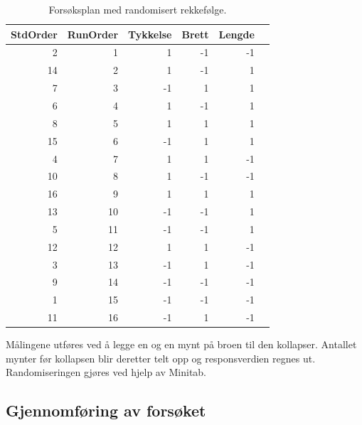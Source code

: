 \documentclass[12pt]{article}
\begin{document}
\begin{table}[H]
  \centering
  \caption{Forsøksplan med randomisert rekkefølge.}
    \begin{tabular}{rrrrrr}
    \toprule
    \multicolumn{1}{l}{\textbf{StdOrder}} & \multicolumn{1}{l}{\textbf{RunOrder}} & \multicolumn{1}{l}{\textbf{Tykkelse}} & \multicolumn{1}{l}{\textbf{Brett}} & \multicolumn{1}{l}{\textbf{Lengde}} & \\
    \midrule
    2     & 1     & 1     & -1    & -1  \\
    \midrule
    14    & 2     & 1     & -1    & 1   \\
    \midrule
    7     & 3     & -1    & 1     & 1   \\
    \midrule
    6     & 4     & 1     & -1    & 1   \\
    \midrule
    8     & 5     & 1     & 1     & 1   \\
    \midrule
    15    & 6     & -1    & 1     & 1   \\
    \midrule
    4     & 7     & 1     & 1     & -1   \\
    \midrule
    10    & 8     & 1     & -1    & -1  \\
    \midrule
    16    & 9     & 1     & 1     & 1   \\
    \midrule
    13    & 10    & -1    & -1    & 1    \\
    \midrule
    5     & 11    & -1    & -1    & 1    \\
    \midrule
    12    & 12    & 1     & 1     & -1   \\
    \midrule
    3     & 13    & -1    & 1     & -1   \\
    \midrule
    9     & 14    & -1    & -1    & -1   \\
    \midrule
    1     & 15    & -1    & -1    & -1   \\
    \midrule
    11    & 16    & -1    & 1     & -1   \\
    \bottomrule
    \end{tabular}%
  \label{tab:tab2}%
\end{table}%

Målingene utføres ved å legge en og en mynt på broen til den kollapser. Antallet mynter før kollapsen blir deretter telt opp og responsverdien regnes ut. Randomiseringen gjøres ved hjelp av Minitab.

\pagebreak
\subsection{Gjennomføring av forsøket}
\end{document}
